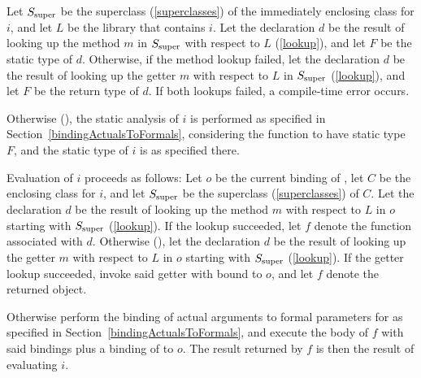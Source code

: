 \documentclass[makeidx]{article}
\begin{document}
{ %

\def\SuperClass{\ensuremath{S_{\mbox{\scriptsize{}super}}}}

\LMHash{}%
Let \SuperClass{} be the superclass (\ref{superclasses})
of the immediately enclosing class for $i$,
and let $L$ be the library that contains $i$.
Let the declaration $d$ be
the result of looking up the method $m$ in \SuperClass{}
with respect to $L$ (\ref{lookup}),
and let $F$ be the static type of $d$.
Otherwise, if the method lookup failed,
let the declaration $d$ be the result of looking up
the getter $m$ with respect to $L$ in \SuperClass{}
(\ref{lookup}),
and let $F$ be the return type of $d$.
If both lookups failed, a compile-time error occurs.

\LMHash{}%
Otherwise (),
the static analysis of $i$ is performed as specified in Section~\ref{bindingActualsToFormals},
considering the function to have static type $F$,
and the static type of $i$ is as specified there.


\LMHash{}%
Evaluation of $i$ proceeds as follows:
Let $o$ be the current binding of \THIS{},
let $C$ be the enclosing class for $i$,
and let \SuperClass{} be the superclass (\ref{superclasses}) of $C$.
Let the declaration $d$ be the result of looking up
the method $m$ with respect to $L$ in $o$ starting with \SuperClass{}
(\ref{lookup}).
If the lookup succeeded,
let $f$ denote the function associated with $d$.
%
Otherwise (),
let the declaration $d$ be the result of looking up
the getter $m$ with respect to $L$ in $o$ starting with \SuperClass{}
(\ref{lookup}).
If the getter lookup succeeded,
invoke said getter with \THIS{} bound to $o$,
and let $f$ denote the returned object.


\LMHash{}%
Otherwise perform the binding of actual arguments to formal parameters for
as specified in Section~\ref{bindingActualsToFormals},
and execute the body of $f$ with said bindings
plus a binding of \THIS{} to $o$.
The result returned by $f$ is then the result of evaluating $i$.

} %
\end{document}

